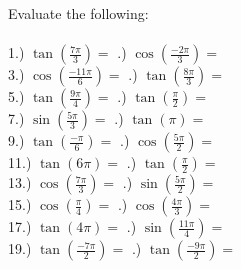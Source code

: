 \documentclass[12pt]{article}
\begin{document}
Evaluate the following:
\\\\

1.) $\tan(\frac{7\pi}{3}) = $ \underline{\hspace{2cm}} \indent\indent\indent{}.) $\cos(\frac{-2\pi}{3}) = $ \underline{\hspace{2cm}} \\

3.) $\cos(\frac{-11\pi}{6}) = $ \underline{\hspace{2cm}} \indent\indent\indent{}.) $\tan(\frac{8\pi}{3}) = $ \underline{\hspace{2cm}} \\

5.) $\tan(\frac{9\pi}{4}) = $ \underline{\hspace{2cm}} \indent\indent\indent{}.) $\tan(\frac{\pi}{2}) = $ \underline{\hspace{2cm}} \\

7.) $\sin(\frac{5\pi}{3}) = $ \underline{\hspace{2cm}} \indent\indent\indent{}.) $\tan(\pi) = $ \underline{\hspace{2cm}} \\

9.) $\tan(\frac{-\pi}{6}) = $ \underline{\hspace{2cm}} \indent\indent\indent{}.) $\cos(\frac{5\pi}{2}) = $ \underline{\hspace{2cm}} \\

11.) $\tan(6\pi) = $ \underline{\hspace{2cm}} \indent\indent\indent{}.) $\tan(\frac{\pi}{2}) = $ \underline{\hspace{2cm}} \\

13.) $\cos(\frac{7\pi}{3}) = $ \underline{\hspace{2cm}} \indent\indent\indent{}.) $\sin(\frac{5\pi}{2}) = $ \underline{\hspace{2cm}} \\

15.) $\cos(\frac{\pi}{4}) = $ \underline{\hspace{2cm}} \indent\indent\indent{}.) $\cos(\frac{4\pi}{3}) = $ \underline{\hspace{2cm}} \\

17.) $\tan(4\pi) = $ \underline{\hspace{2cm}} \indent\indent\indent{}.) $\sin(\frac{11\pi}{4}) = $ \underline{\hspace{2cm}} \\

19.) $\tan(\frac{-7\pi}{2}) = $ \underline{\hspace{2cm}} \indent\indent\indent{}.) $\tan(\frac{-9\pi}{2}) = $ \underline{\hspace{2cm}} \\
\end{document}
